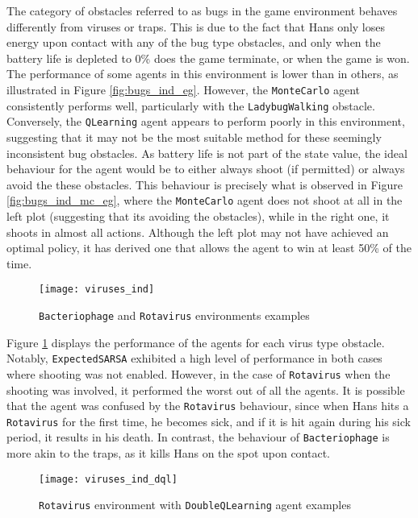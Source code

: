 The category of obstacles referred to as bugs in the game environment behaves differently from viruses or traps. This is due to the fact that Hans only loses energy upon contact with any of the bug type obstacles, and only when the battery life is depleted to 0\% does the game terminate, or when the game is won. The performance of some agents in this environment is lower than in others, as illustrated in Figure \ref{fig:bugs_ind_eg}. However, the \texttt{MonteCarlo} agent consistently performs well, particularly with the \texttt{LadybugWalking} obstacle. Conversely, the \texttt{QLearning} agent appears to perform poorly in this environment, suggesting that it may not be the most suitable method for these seemingly inconsistent bug obstacles. As battery life is not part of the state value, the ideal behaviour for the agent would be to either always shoot (if permitted) or always avoid the these obstacles. This behaviour is precisely what is observed in Figure \ref{fig:bugs_ind_mc_eg}, where the \texttt{MonteCarlo} agent does not shoot at all in the left plot (suggesting that its avoiding the obstacles), while in the right one, it shoots in almost all actions. Although the left plot may not have achieved an optimal policy, it has derived one that allows the agent to win at least 50\% of the time.

\begin{figure}[h]
    \centering
    \texttt{[image: viruses\_ind]}
    \caption{\texttt{Bacteriophage} and \texttt{Rotavirus} environments examples}
    \label{fig:viruses_ind_eg}
\end{figure}

Figure \ref{fig:viruses_ind_eg} displays the performance of the agents for each virus type obstacle. Notably, \texttt{ExpectedSARSA} exhibited a high level of performance in both cases where shooting was not enabled. However, in the case of \texttt{Rotavirus} when the shooting was involved, it performed the worst out of all the agents. It is possible that the agent was confused by the \texttt{Rotavirus} behaviour, since when Hans hits a \texttt{Rotavirus} for the first time, he becomes sick, and if it is hit again during his sick period, it results in his death. In contrast, the behaviour of \texttt{Bacteriophage} is more akin to the traps, as it kills Hans on the spot upon contact.

\begin{figure}[h]
    \centering
    \texttt{[image: viruses\_ind\_dql]}
    \caption{\texttt{Rotavirus} environment with \texttt{DoubleQLearning} agent examples}
    \label{fig:viruses_ind_dql_eg}
\end{figure}

